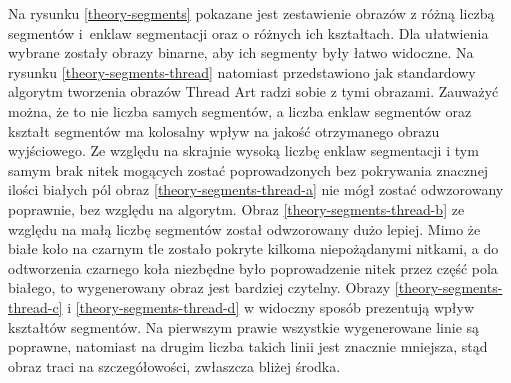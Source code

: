         Na rysunku \ref{theory-segments} pokazane jest zestawienie obrazów z różną liczbą segmentów i~enklaw segmentacji oraz o różnych ich kształtach. Dla ułatwienia wybrane zostały obrazy binarne, aby ich segmenty były łatwo widoczne. Na rysunku \ref{theory-segments-thread} natomiast przedstawiono jak standardowy algorytm tworzenia obrazów Thread Art radzi sobie z tymi obrazami. Zauważyć można, że to nie liczba samych segmentów, a liczba enklaw segmentów oraz kształt segmentów ma kolosalny wpływ na jakość otrzymanego obrazu wyjściowego. Ze względu na skrajnie wysoką liczbę enklaw segmentacji i tym samym brak nitek mogących zostać poprowadzonych bez pokrywania znacznej ilości białych pól obraz \ref{theory-segments-thread-a} nie mógł zostać odwzorowany poprawnie, bez względu na algorytm. Obraz \ref{theory-segments-thread-b} ze względu na małą liczbę segmentów został odwzorowany dużo lepiej. Mimo że białe koło na czarnym tle zostało pokryte kilkoma niepożądanymi nitkami, a do odtworzenia czarnego koła niezbędne było poprowadzenie nitek przez część pola białego, to wygenerowany obraz jest bardziej czytelny. Obrazy \ref{theory-segments-thread-c} i \ref{theory-segments-thread-d} w widoczny sposób prezentują wpływ kształtów segmentów. Na pierwszym prawie wszystkie wygenerowane linie są poprawne, natomiast na drugim liczba takich linii jest znacznie mniejsza, stąd obraz traci na szczegółowości, zwłaszcza bliżej środka.
        
